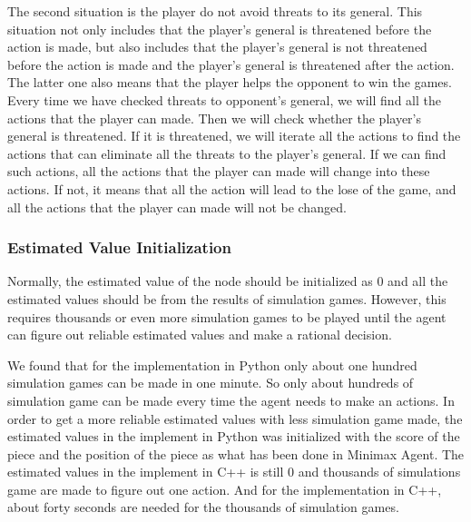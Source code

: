 The second situation is the player do not avoid threats to its general. 
This situation not only includes that the player's general is threatened before the action is made, but also includes that the player's general is not threatened before the action is made and the player's general is threatened after the action. 
The latter one also means that the player helps the opponent to win the games. 
Every time we have checked threats to opponent's general, we will find all the actions that the player can made. 
Then we will check whether the player's general is threatened. 
If it is threatened, we will iterate all the actions to find the actions that can eliminate all the threats to the player's general. 
If we can find such actions, all the actions that the player can made will change into these actions. 
If not, it means that all the action will lead to the lose of the game, and all the actions that the player can made will not be changed. 

\subsubsection{Estimated Value Initialization}
Normally, the estimated value of the node should be initialized as 0 and all the estimated values should be from the results of simulation games. 
However, this requires thousands or even more simulation games to be played until the agent can figure out reliable estimated values and make a rational decision. 

We found that for the implementation in Python only about one hundred simulation games can be made in one minute. 
So only about hundreds of simulation game can be made every time the agent needs to make an actions. 
In order to get a more reliable estimated values with less simulation game made, the estimated values in the implement in Python was initialized with the score of the piece and the position of the piece as what has been done in Minimax Agent. 
The estimated values in the implement in C++ is still 0 and thousands of simulations game are made to figure out one action. 
And for the implementation in C++, about forty seconds are needed for the thousands of simulation games. 

